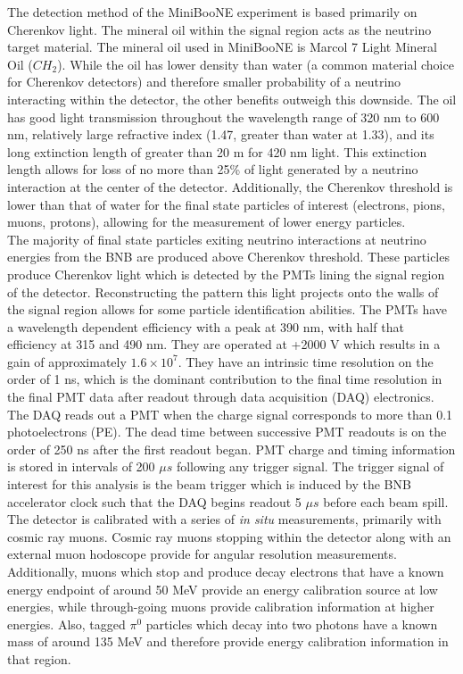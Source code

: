 The detection method of the MiniBooNE experiment is based primarily on Cherenkov light. The mineral oil within the signal region acts as the neutrino target material. The mineral oil used in MiniBooNE is Marcol 7 Light Mineral Oil ($CH_2$). While the oil has lower density than water (a common material choice for Cherenkov detectors) and therefore smaller probability of a neutrino interacting within the detector, the other benefits outweigh this downside. The oil has good light transmission throughout the wavelength range of 320 nm to 600 nm, relatively large refractive index (1.47, greater than water at 1.33), and its long extinction length of greater than 20 m for 420 nm light. This extinction length allows for loss of no more than 25\% of light generated by a neutrino interaction at the center of the detector. Additionally, the Cherenkov threshold is lower than that of water for the final state particles of interest (electrons, pions, muons, protons), allowing for the measurement of lower energy particles.\\

The majority of final state particles exiting neutrino interactions at neutrino energies from the BNB are produced above Cherenkov threshold. These particles produce Cherenkov light which is detected by the PMTs lining the signal region of the detector. Reconstructing the pattern this light projects onto the walls of the signal region allows for some particle identification abilities. The PMTs have a wavelength dependent efficiency with a peak at 390 nm, with half that efficiency at 315 and 490 nm. They are operated at +2000 V which results in a gain of approximately $1.6 \times 10^7$. They have an intrinsic time resolution on the order of 1 ns, which is the dominant contribution to the final time resolution in the final PMT data after readout through data acquisition (DAQ) electronics. The DAQ reads out a PMT when the charge signal corresponds to more than 0.1 photoelectrons (PE). The dead time between successive PMT readouts is on the order of 250 ns after the first readout began. PMT charge and timing information is stored in intervals of 200 $\mu s$ following any trigger signal. The trigger signal of interest for this analysis is the beam trigger which is induced by the BNB accelerator clock such that the DAQ begins readout 5 $\mu s$ before each beam spill.\\

The detector is calibrated with a series of \textit{in situ} measurements, primarily with cosmic ray muons. Cosmic ray muons stopping within the detector along with an external muon hodoscope provide for angular resolution measurements. Additionally, muons which stop and produce decay electrons that have a known energy endpoint of around 50 MeV provide an energy calibration source at low energies, while through-going muons provide calibration information at higher energies. Also, tagged $\pi^0$ particles which decay into two photons have a known mass of around 135 MeV and therefore provide energy calibration information in that region.\\

